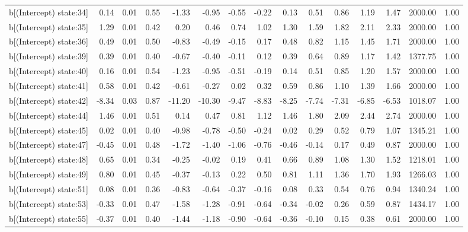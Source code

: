 \begin{table}[ht]
\begin{tabular}{rrrrrrrrrrrrrrr}
  b[(Intercept) state:34] & 0.14 & 0.01 & 0.55 & -1.33 & -0.95 & -0.55 & -0.22 & 0.13 & 0.51 & 0.86 & 1.19 & 1.47 & 2000.00 & 1.00 \\ 
  b[(Intercept) state:35] & 1.29 & 0.01 & 0.42 & 0.20 & 0.46 & 0.74 & 1.02 & 1.30 & 1.59 & 1.82 & 2.11 & 2.33 & 2000.00 & 1.00 \\ 
  b[(Intercept) state:36] & 0.49 & 0.01 & 0.50 & -0.83 & -0.49 & -0.15 & 0.17 & 0.48 & 0.82 & 1.15 & 1.45 & 1.71 & 2000.00 & 1.00 \\ 
  b[(Intercept) state:39] & 0.39 & 0.01 & 0.40 & -0.67 & -0.40 & -0.11 & 0.12 & 0.39 & 0.64 & 0.89 & 1.17 & 1.42 & 1377.75 & 1.00 \\ 
  b[(Intercept) state:40] & 0.16 & 0.01 & 0.54 & -1.23 & -0.95 & -0.51 & -0.19 & 0.14 & 0.51 & 0.85 & 1.20 & 1.57 & 2000.00 & 1.00 \\ 
  b[(Intercept) state:41] & 0.58 & 0.01 & 0.42 & -0.61 & -0.27 & 0.02 & 0.32 & 0.59 & 0.86 & 1.10 & 1.39 & 1.66 & 2000.00 & 1.00 \\ 
  b[(Intercept) state:42] & -8.34 & 0.03 & 0.87 & -11.20 & -10.30 & -9.47 & -8.83 & -8.25 & -7.74 & -7.31 & -6.85 & -6.53 & 1018.07 & 1.00 \\ 
  b[(Intercept) state:44] & 1.46 & 0.01 & 0.51 & 0.14 & 0.47 & 0.81 & 1.12 & 1.46 & 1.80 & 2.09 & 2.44 & 2.74 & 2000.00 & 1.00 \\ 
  b[(Intercept) state:45] & 0.02 & 0.01 & 0.40 & -0.98 & -0.78 & -0.50 & -0.24 & 0.02 & 0.29 & 0.52 & 0.79 & 1.07 & 1345.21 & 1.00 \\ 
  b[(Intercept) state:47] & -0.45 & 0.01 & 0.48 & -1.72 & -1.40 & -1.06 & -0.76 & -0.46 & -0.14 & 0.17 & 0.49 & 0.87 & 2000.00 & 1.00 \\ 
  b[(Intercept) state:48] & 0.65 & 0.01 & 0.34 & -0.25 & -0.02 & 0.19 & 0.41 & 0.66 & 0.89 & 1.08 & 1.30 & 1.52 & 1218.01 & 1.00 \\ 
  b[(Intercept) state:49] & 0.80 & 0.01 & 0.45 & -0.37 & -0.13 & 0.22 & 0.50 & 0.81 & 1.11 & 1.36 & 1.70 & 1.93 & 1266.03 & 1.00 \\ 
  b[(Intercept) state:51] & 0.08 & 0.01 & 0.36 & -0.83 & -0.64 & -0.37 & -0.16 & 0.08 & 0.33 & 0.54 & 0.76 & 0.94 & 1340.24 & 1.00 \\ 
  b[(Intercept) state:53] & -0.33 & 0.01 & 0.47 & -1.58 & -1.28 & -0.91 & -0.64 & -0.34 & -0.02 & 0.26 & 0.59 & 0.87 & 1434.17 & 1.00 \\ 
  b[(Intercept) state:55] & -0.37 & 0.01 & 0.40 & -1.44 & -1.18 & -0.90 & -0.64 & -0.36 & -0.10 & 0.15 & 0.38 & 0.61 & 2000.00 & 1.00 \\ 

\end{tabular}
\end{table}

